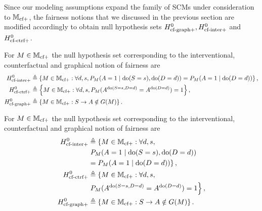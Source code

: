 Since our modeling assumptions expand the family of SCMs under consideration to $\mathbb{M}_{\text{cf}+}$, the fairness notions that we discussed in the previous section are modified accordingly to obtain null hypothesis sets $ H^0_{\text{cf-graph}+}, H^0_{\text{cf-inter}+}$ and $H^0_{\text{cf-ctrf}+}$. 
\ifdefined\SINGLE
\begin{definition}\label{def:notions-cf}
For $M \in \mathbb{M}_{\text{cf}+}$ the null hypothesis set corresponding to the interventional, counterfactual and graphical notion of fairness are 
\begin{align*}\label{eq:cf-def}
    H^0_{\text{cf-inter}+} &\triangleq \left \lbrace M \in \mathbb{M}_{\text{cf}+}: \forall d,s, P_{M}{\left({A=1\mid\text{do}(S=s),\text{do}(D=d)}\right)} = P_{M}{\left({A=1\mid\text{do}(D = d)}\right)} \right \rbrace, \\
     H^0_{\text{cf-ctrf}+} &\triangleq \left \lbrace M \in \mathbb{M}_{\text{cf}+}: \forall d, s, P_M(A^{\text{do}(S=s,D=d)} = A^{\text{do}(D=d)}) = 1 \right \rbrace, \\
     H^0_{\text{cf-graph}+}&\triangleq \left \lbrace M \in \mathbb{M}_{\text{cf}+} : S \rightarrow A \notin G{\left({M}\right)} \right \rbrace.
\end{align*}
\end{definition}
\else
\begin{definition}\label{def:notions-cf}
For $M \in \mathbb{M}_{\text{cf}+}$ the null hypothesis set corresponding to the interventional, counterfactual and graphical notion of fairness are 
\begin{align*}\label{eq:cf-def}
    H^0_{\text{cf-inter}+} &\triangleq \left \lbrace M \in \mathbb{M}_{\text{cf}+}: \forall d,s, \right.\\
    &\left. P_{M}{\left({A=1\mid\text{do}(S=s),\text{do}(D=d)}\right)} \right.\\
    &\left. = P_{M}{\left({A=1\mid\text{do}(D = d)}\right)} \right \rbrace, \\
     H^0_{\text{cf-ctrf}+} &\triangleq \left \lbrace M \in \mathbb{M}_{\text{cf}+}: \forall d, s, \right.\\
     &\left. P_M(A^{\text{do}(S=s,D=d)} = A^{\text{do}(D=d)}) = 1 \right \rbrace, \\
     H^0_{\text{cf-graph}+} &\triangleq \left \lbrace M \in \mathbb{M}_{\text{cf}+} : S \rightarrow A \notin G{\left({M}\right)} \right \rbrace.
\end{align*}
\end{definition}
\fi

